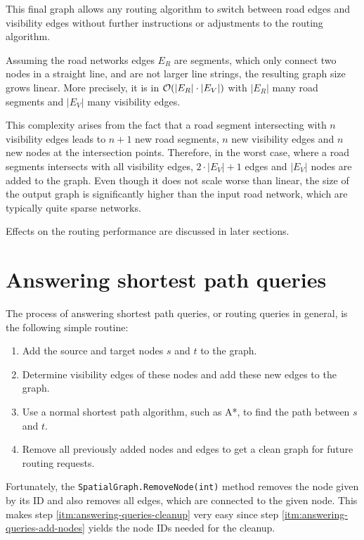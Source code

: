 		This final graph allows any routing algorithm to switch between road edges and visibility edges without further instructions or adjustments to the routing algorithm.

		Assuming the road networks edges $E_R$ are segments, which only connect two nodes in a straight line, and are not larger line strings, the resulting graph size grows linear.
		More precisely, it is in $\mathcal{O}(|E_R| \cdot |E_V|)$ with $|E_R|$ many road segments and $|E_V|$ many visibility edges.
		
		This complexity arises from the fact that a road segment intersecting with $n$ visibility edges leads to $n+1$ new road segments, $n$ new visibility edges and $n$ new nodes at the intersection points.
		Therefore, in the worst case, where a road segments intersects with all visibility edges, $2 \cdot |E_V| + 1$ edges and $|E_V|$ nodes are added to the graph.
		Even though it does not scale worse than linear, the size of the output graph is significantly higher than the input road network, which are typically quite sparse networks.

		Effects on the routing performance are discussed in later sections. 
	
\section{Answering shortest path queries}
\label{sec:answering-queries}

	The process of answering shortest path queries, or routing queries in general, is the following simple routine:
	
	\begin{enumerate}
		\item \label{itm:answering-queries-add-nodes} Add the source and target nodes $s$ and $t$ to the graph.
		\item \label{itm:answering-queries-vis-edges} Determine visibility edges of these nodes and add these new edges to the graph.
		\item \label{itm:answering-queries-routing} Use a normal shortest path algorithm, such as A*, to find the path between $s$ and $t$.
		\item \label{itm:answering-queries-cleanup} Remove all previously added nodes and edges to get a clean graph for future routing requests.
	\end{enumerate}
	Fortunately, the \texttt{SpatialGraph.RemoveNode(int)} method removes the node given by its ID and also removes all edges, which are connected to the given node.
	This makes step \ref{itm:answering-queries-cleanup} very easy since step \ref{itm:answering-queries-add-nodes} yields the node IDs needed for the cleanup.
	
